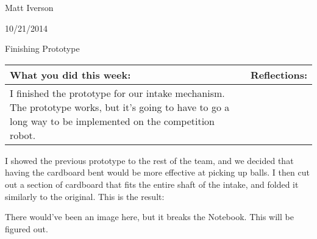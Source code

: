 Matt Iverson

10/21/2014

Finishing Prototype

\begin{tabular}{|p{5cm}|p{5cm}|}
 \hline
 What you did this week: &
 Reflections: \\
 \hline
 I finished the prototype for our intake mechanism.
 The prototype works, but it’s going to have to go a long way to be implemented on the competition robot.\\
 \hline
\end{tabular}

I showed the previous prototype to the rest of the team, and we decided that having the cardboard bent would be more effective at picking up balls. I then cut out a section of cardboard that fits the entire shaft of the intake, and folded it similarly to the original. This is the result: 

There would've been an image here, but it breaks the Notebook. This will be figured out.

